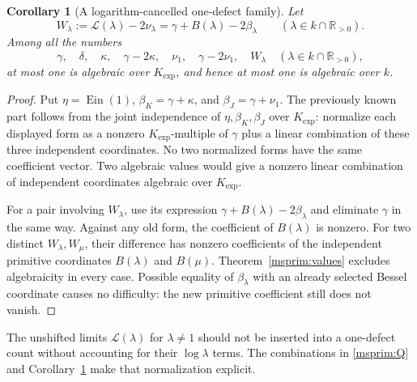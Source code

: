 \documentclass[11pt]{article}
\newtheorem{corollary}[theorem]{Corollary}
\theoremstyle{definition}
\theoremstyle{remark}
\newcommand{\Ein}{\operatorname{Ein}}
\begin{document}
\begin{corollary}[A logarithm-cancelled one-defect family]
\label{msprim:W}
Let
\[
 W_\lambda:=\mathcal L(\lambda)-2\nu_\lambda
 =\gamma+B(\lambda)-2\beta_\lambda
 \qquad(\lambda\in k\cap\mathbb R_{>0}).
\]
Among all the numbers
\[
 \gamma,\quad\delta,\quad\kappa,\quad\gamma-2\kappa,\quad
 \nu_1,\quad\gamma-2\nu_1,\quad
 W_\lambda\quad(\lambda\in k\cap\mathbb R_{>0}),
\]
at most one is algebraic over $K_{\exp}$, and hence at most one is
algebraic over $k$.
\end{corollary}
\begin{proof}
Put $\eta=\Ein(1)$, $\beta_K=\gamma+\kappa$, and
$\beta_J=\gamma+\nu_1$. The previously known part follows from the
joint independence of $\eta,\beta_K,\beta_J$ over $K_{\exp}$:
normalize each displayed form as a nonzero $K_{\exp}$-multiple of
$\gamma$ plus a linear combination of these three independent
coordinates. No two normalized forms have the same coefficient
vector. Two algebraic values would give a nonzero linear combination
of independent coordinates algebraic over $K_{\exp}$.

For a pair involving $W_\lambda$, use its expression
$\gamma+B(\lambda)-2\beta_\lambda$ and eliminate $\gamma$ in the
same way. Against any old form, the coefficient of $B(\lambda)$
is nonzero. For two distinct $W_\lambda,W_\mu$, their difference
has nonzero coefficients of the independent primitive coordinates
$B(\lambda)$ and $B(\mu)$. Theorem~\ref{msprim:values} excludes
algebraicity in every case. Possible equality of $\beta_\lambda$
with an already selected Bessel coordinate causes no difficulty:
the new primitive coefficient still does not vanish.
\end{proof}

The unshifted limits $\mathcal L(\lambda)$ for $\lambda\ne1$ should
not be inserted into a one-defect count without accounting for their
$\log\lambda$ terms. The combinations in \eqref{msprim:Q} and
Corollary~\ref{msprim:W} make that normalization explicit.
\end{document}
